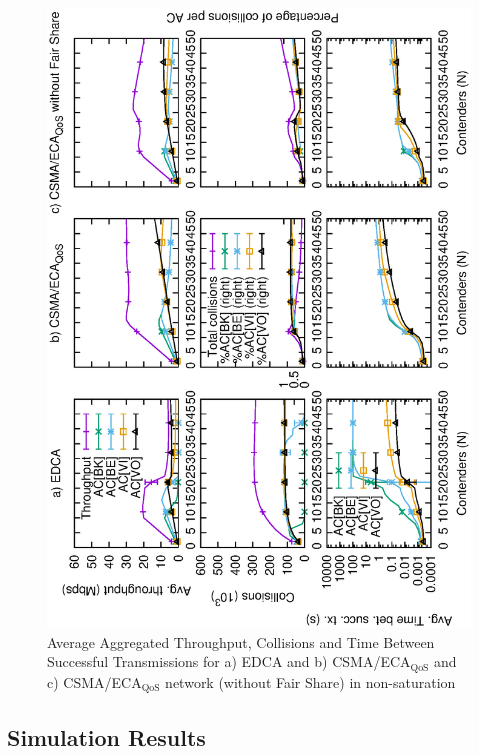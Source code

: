 \begin{figure}[tb]
	\centering
		\includegraphics[width=0.55\linewidth,angle = -90]{figures/multiplot-unsat-error-0-1.eps}
		\caption{Average Aggregated Throughput, Collisions and Time Between Successful Transmissions for a) EDCA and b) CSMA/ECA$_{\text{QoS}}$ and c) CSMA/ECA$_{\text{QoS}}$ network (without Fair Share) in non-saturation}
		\label{fig:multiplotUnsat}
\end{figure}


\subsection{Simulation Results}\label{sim:results}
